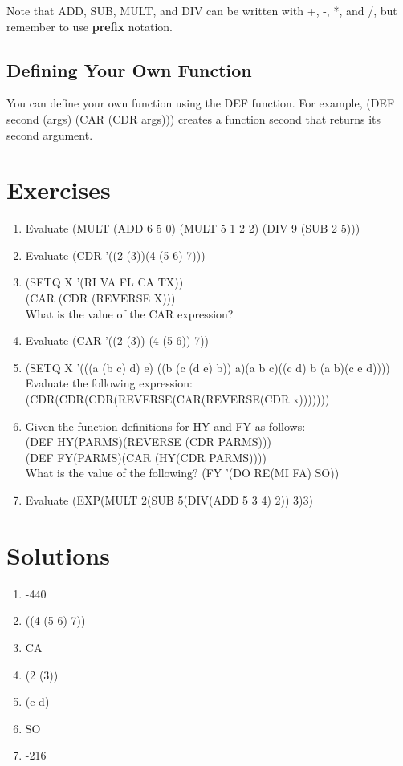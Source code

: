 \documentclass[11pt,letterpaper]{article}
\begin{document}
    Note that ADD, SUB, MULT, and DIV can be written with +, -, *, and /,
    but remember to use \textbf{prefix} notation.

    \subsection{Defining Your Own Function}
    You can define your own function using the DEF function.
    For example, (DEF second (args) (CAR (CDR args))) creates
    a function second that returns its second argument.

    \section{Exercises}
    \begin{enumerate}
        \item Evaluate (MULT (ADD 6 5 0) (MULT 5 1 2 2) (DIV 9 (SUB 2 5)))
        \item Evaluate (CDR '((2 (3))(4 (5 6) 7)))
        \item (SETQ X '(RI VA FL CA TX))\\
        (CAR (CDR (REVERSE X)))\\
        What is the value of the CAR expression?
        \item Evaluate (CAR '((2 (3)) (4 (5 6)) 7))
        \item (SETQ X '(((a (b c) d) e) ((b (c (d e) b)) a)(a b c)((c d) b (a b)(c e d))))\\
        Evaluate the following expression:\\
        (CDR(CDR(CDR(REVERSE(CAR(REVERSE(CDR x)))))))
        \item Given the function definitions for HY and FY as follows:\\
        (DEF HY(PARMS)(REVERSE (CDR PARMS)))\\
        (DEF FY(PARMS)(CAR (HY(CDR PARMS))))\\
        What is the value of the following?
        (FY '(DO RE(MI FA) SO))
        \item Evaluate
        (EXP(MULT 2(SUB 5(DIV(ADD 5 3 4) 2)) 3)3)
    \end{enumerate}

    \newpage
    \section{Solutions}
    \begin{enumerate}
        \item -440
        \item ((4 (5 6) 7))
        \item CA
        \item (2 (3))
        \item (e d)
        \item SO
        \item -216
    \end{enumerate}
\end{document}
